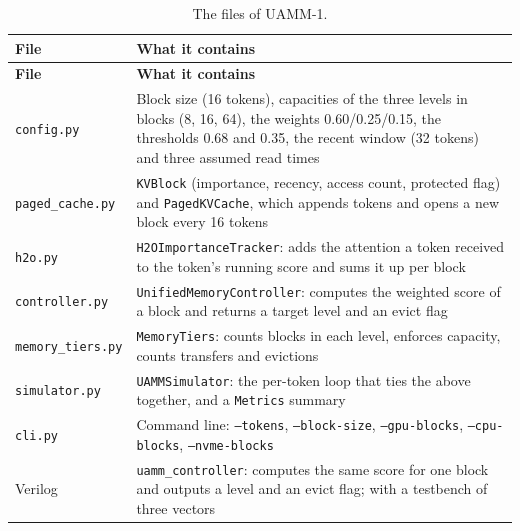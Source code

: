 \documentclass[12pt,a4paper]{report}
\begin{document}
{\fontsize{8}{9.5}\selectfont\setlength{\tabcolsep}{3pt}
\begin{longtable}{>{\raggedright\arraybackslash}p{1.25in}>{\raggedright\arraybackslash}p{4.81in}}
\caption{The files of UAMM-1.}\\
\toprule
\textbf{File} & \textbf{What it contains} \\\midrule\endfirsthead
\toprule \textbf{File} & \textbf{What it contains} \\\midrule\endhead
\bottomrule\endfoot
\texttt{config.\allowbreak{}py} & Block size (16 tokens), capacities of the three levels in blocks (8, 16, 64), the weights 0.60/0.25/0.15, the thresholds 0.68 and 0.35, the recent window (32 tokens) and three assumed read times \\
\texttt{paged\_\allowbreak{}\allowbreak{}cache.\allowbreak{}py} & \texttt{KVBlock} (importance, recency, access count, protected flag) and \texttt{PagedKVCache}, which appends tokens and opens a new block every 16 tokens \\
\texttt{h2o.\allowbreak{}py} & \texttt{H2OImportanceTracker}: adds the attention a token received to the token's running score and sums it up per block \\
\texttt{controller.\allowbreak{}py} & \texttt{UnifiedMemoryController}: computes the weighted score of a block and returns a target level and an evict flag \\
\texttt{memory\_\allowbreak{}\allowbreak{}tiers.\allowbreak{}py} & \texttt{MemoryTiers}: counts blocks in each level, enforces capacity, counts transfers and evictions \\
\texttt{simulator.\allowbreak{}py} & \texttt{UAMMSimulator}: the per-token loop that ties the above together, and a \texttt{Metrics} summary \\
\texttt{cli.\allowbreak{}py} & Command line: \texttt{--tokens}, \texttt{--block-size}, \texttt{--gpu-blocks}, \texttt{--cpu-blocks}, \texttt{--nvme-blocks} \\
Verilog & \texttt{uamm\_\allowbreak{}\allowbreak{}controller}: computes the same score for one block and outputs a level and an evict flag; with a testbench of three vectors \\
\bottomrule
\end{longtable}}
\end{document}
